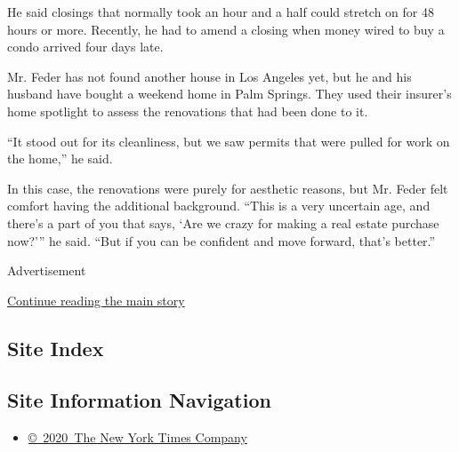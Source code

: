 He said closings that normally took an hour and a half could stretch on
for 48 hours or more. Recently, he had to amend a closing when money
wired to buy a condo arrived four days late.

Mr. Feder has not found another house in Los Angeles yet, but he and his
husband have bought a weekend home in Palm Springs. They used their
insurer's home spotlight to assess the renovations that had been done to
it.

``It stood out for its cleanliness, but we saw permits that were pulled
for work on the home,'' he said.

In this case, the renovations were purely for aesthetic reasons, but Mr.
Feder felt comfort having the additional background. ``This is a very
uncertain age, and there's a part of you that says, `Are we crazy for
making a real estate purchase now?''' he said. ``But if you can be
confident and move forward, that's better.''

Advertisement

\protect\hyperlink{after-bottom}{Continue reading the main story}

\hypertarget{site-index}{%
\subsection{Site Index}\label{site-index}}

\hypertarget{site-information-navigation}{%
\subsection{Site Information
Navigation}\label{site-information-navigation}}

\begin{itemize}
\tightlist
\item
  \href{https://help.nytimes3xbfgragh.onion/hc/en-us/articles/115014792127-Copyright-notice}{©~2020~The
  New York Times Company}
\end{itemize}

